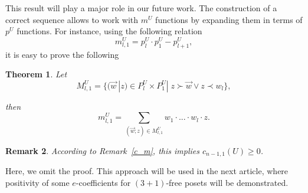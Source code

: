 \documentclass{article}
\theoremstyle{plain}
\newtheorem{thm}{Theorem}[section]
\newtheorem{remark}[thm]{Remark}
\theoremstyle{definition}
\newcommand{\vs}{\vec w}
\begin{document}
\newcommand{\ind}{l}
This result will play a major role in our future work. The construction of a correct sequence allows to work with $m^U$ functions by expanding them in terms of $p^U$ functions. For instance, using the following relation
$$m^U_{\ind,1}=p^U_\ind\cdot p^U_1 - p^U_{\ind+1},$$
it is easy to prove the following 



\begin{thm}\label{Thn1}
Let $$M_{\ind,1}^U = \{(\vs\ |z)\in P^U_{\ind}\times P^U_1| \; z\succ\vs\vee z\prec w_\ind\},$$

then $$m^U_{\ind,1}=\sum\limits_{(\vs;z)\in M^U_{\ind,1}}w_1\cdot...\cdot w_\ind\cdot z.$$
\end{thm}
\begin{remark}
According to Remark~\ref{c_m}, this implies $c_{n-1,1}(U)\geq 0$.
\end{remark}

Here, we omit the proof. This approach will be used in the next article, where positivity of some $e$-coefficients for $(3+1)$-free posets will be demonstrated.





\end{document}

